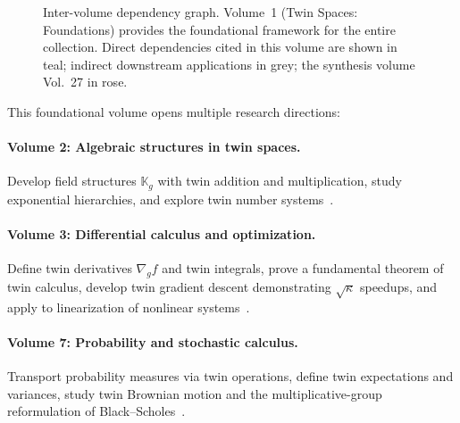 \documentclass[11pt,a4paper,openany]{book}
\theoremstyle{plain}
\theoremstyle{definition}
\newcommand{\twinfield}[1]{\mathbb{K}_{#1}}
\begin{document}
\begin{figure}[ht]
\caption{Inter-volume dependency graph. Volume~1 (Twin Spaces: Foundations) provides
the foundational framework for the entire collection. Direct dependencies cited in
this volume are shown in teal; indirect downstream applications in grey; the
synthesis volume Vol.~27 in rose.}
\label{fig:inter-volume}
\end{figure}

This foundational volume opens multiple research directions:

\paragraph{Volume 2: Algebraic structures in twin spaces.} Develop field structures $\twinfield{g}$ with twin addition and multiplication, study exponential hierarchies, and explore twin number systems~\cite{Vol02}.

\paragraph{Volume 3: Differential calculus and optimization.} Define twin derivatives $\nabla_g f$ and twin integrals, prove a fundamental theorem of twin calculus, develop twin gradient descent demonstrating $\sqrt{\kappa}$ speedups, and apply to linearization of nonlinear systems~\cite{Vol03}.

\paragraph{Volume 7: Probability and stochastic calculus.} Transport probability measures via twin operations, define twin expectations and variances, study twin Brownian motion and the multiplicative-group reformulation of Black--Scholes~\cite{Vol07}.
\end{document}
